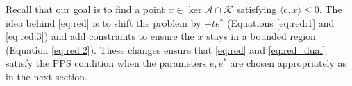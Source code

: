 \documentclass{article}
\newcommand{\inProd}[2]{\langle #1 , #2 \rangle }
\newcommand{\stdMap}{ {\mathcal{A}}}
\newcommand{\stdCone}{ {\mathcal{K}}}
\newcommand{\stdFace}{ \mathcal{F}}
\newcommand{\stdInt}{ {e}}
\renewcommand{\Re}{\mathbb{R}}
\newcommand{\T}{\ast\hspace{-1pt}}
\begin{document}
Recall that our goal is to find a point $x \in \ker \stdMap \cap \stdCone$ satisfying  $\inProd{c}{x} \leq 0$. The idea behind  \eqref{eq:red} is to shift the problem by $-t\stdInt^*$ (Equations \eqref{eq:red:1} and \eqref{eq:red:3}) and add constraints to ensure 
the $x$ stays in a bounded region (Equation \eqref{eq:red:2}). These changes ensure that \eqref{eq:red} and \eqref{eq:red_dual} 
satisfy the PPS condition when the parameters $\stdInt, \stdInt^*$ are chosen appropriately as in
the next section.






%
\end{document}
